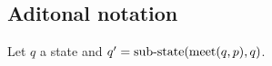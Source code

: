 \subsection{Aditonal notation}

\begin{mylem}\label{lem-new-state}
Let $q$ a state and $q' = {\text{\rm sub-state}}(\text{\rm meet}(q,p),q)$. 
\end{mylem}


%
